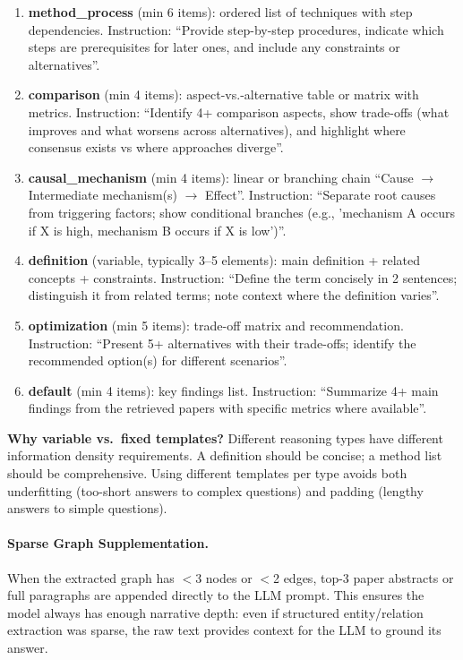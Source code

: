 \documentclass[11pt]{article}
\begin{document}
\begin{enumerate}[leftmargin=1.2em]
  \item \textbf{method\_process} (min 6 items): ordered list of techniques with step dependencies. Instruction: ``Provide step-by-step procedures, indicate which steps are prerequisites for later ones, and include any constraints or alternatives''.
  
  \item \textbf{comparison} (min 4 items): aspect-vs.-alternative table or matrix with metrics. Instruction: ``Identify 4+ comparison aspects, show trade-offs (what improves and what worsens across alternatives), and highlight where consensus exists vs where approaches diverge''.
  
  \item \textbf{causal\_mechanism} (min 4 items): linear or branching chain ``Cause $\rightarrow$ Intermediate mechanism(s) $\rightarrow$ Effect''. Instruction: ``Separate root causes from triggering factors; show conditional branches (e.g., 'mechanism A occurs if X is high, mechanism B occurs if X is low')''.
  
  \item \textbf{definition} (variable, typically 3--5 elements): main definition + related concepts + constraints. Instruction: ``Define the term concisely in 2 sentences; distinguish it from related terms; note context where the definition varies''.
  
  \item \textbf{optimization} (min 5 items): trade-off matrix and recommendation. Instruction: ``Present 5+ alternatives with their trade-offs; identify the recommended option(s) for different scenarios''.
  
  \item \textbf{default} (min 4 items): key findings list. Instruction: ``Summarize 4+ main findings from the retrieved papers with specific metrics where available''.
\end{enumerate}

\textbf{Why variable vs.\ fixed templates?} Different reasoning types have different information density requirements. A definition should be concise; a method list should be comprehensive. Using different templates per type avoids both underfitting (too-short answers to complex questions) and padding (lengthy answers to simple questions).

\paragraph{Sparse Graph Supplementation.} When the extracted graph has $<$3 nodes or $<$2 edges, top-3 paper abstracts or full paragraphs are appended directly to the LLM prompt. This ensures the model always has enough narrative depth: even if structured entity/relation extraction was sparse, the raw text provides context for the LLM to ground its answer.
\end{document}
